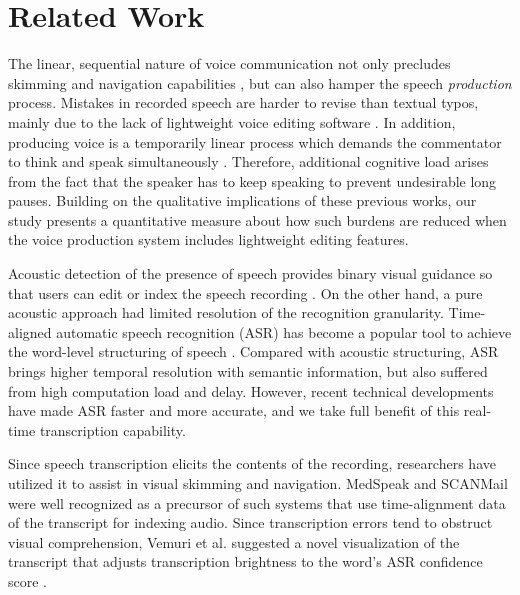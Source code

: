\section{Related Work}

The linear, sequential nature of voice communication not only precludes skimming and navigation capabilities \cite{grudin}, but can also hamper the speech \emph{production} process. 
Mistakes in recorded speech are harder to revise than textual typos, mainly due to the lack of lightweight voice editing software \cite{marriott2002}. 
In addition, producing voice is a temporarily linear process which demands the commentator to think and speak simultaneously \cite{marriott2002, yoon:2015}. 
Therefore, additional cognitive load arises from the fact that the speaker has to keep speaking to prevent undesirable long pauses. 
Building on the qualitative implications of these previous works, our study presents a quantitative measure about how such burdens are reduced when the voice production system includes lightweight editing features.

Acoustic detection of the presence of speech provides binary visual guidance so that users can edit or index the speech recording \cite{ades1986, hindus:1992}. 
On the other hand, a pure acoustic approach had limited resolution of the recognition granularity. 
Time-aligned automatic speech recognition (ASR) has become a popular tool to achieve the word-level structuring of speech \cite{Schmandt81, Wilcox:1992}. 
Compared with acoustic structuring, ASR brings higher temporal resolution with semantic information, but also suffered from high computation load and delay. 
However, recent technical developments have made ASR faster and more accurate, and we take full benefit of this real-time transcription capability.

Since speech transcription elicits the contents of the recording, researchers have utilized it to assist in visual skimming and navigation. 
MedSpeak \cite{Lai:1997} and SCANMail \cite{whittaker} were well recognized as a precursor of such systems that use time-alignment data of the transcript for indexing audio. 
Since transcription errors tend to obstruct visual comprehension, Vemuri et al. suggested a novel visualization of the transcript that adjusts transcription brightness to the word's ASR confidence score \cite{Vemuri:2004}. 

